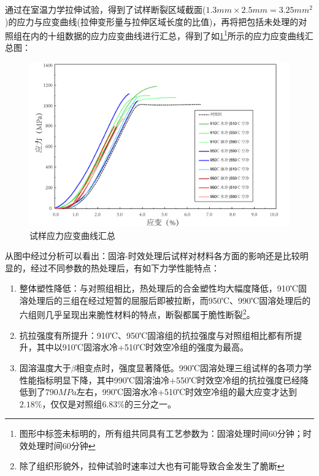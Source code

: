 通过在室温力学拉伸试验，得到了试样断裂区域截面($ 1.3mm\times2.5mm=3.25mm^2 $)的应力与应变曲线(拉伸变形量与拉伸区域长度的比值)，再将把包括未处理的对照组在内的十组数据的应力应变曲线进行汇总，得到了如\ref{fig:试样应力应变曲线汇总}\footnote{图形中标签未标明的，所有组共同具有工艺参数为：固溶处理时间60分钟；时效处理时间60分钟}所示的应力应变曲线汇总图：
\begin{figure}[h!]
	\centering
	\includegraphics[width=0.99\linewidth]{pic/试样应力应变曲线汇总min.png}
	\caption{试样应力应变曲线汇总}
	\label{fig:试样应力应变曲线汇总}
\end{figure}


从图中经过分析可以看出：固溶-时效处理后试样对材料各方面的影响还是比较明显的，经过不同参数的热处理后，有如下力学性能特点：
\begin{enumerate}
	\item {整体塑性降低：}与对照组相比，热处理后的合金塑性均大幅度降低，910℃固溶处理后的三组在经过短暂的屈服后即被拉断，而950℃、990℃固溶处理后的六组则几乎呈现出来脆性材料的特点，断裂都属于脆性断裂\footnote{除了组织形貌外，拉伸试验时速率过大也有可能导致合金发生了脆断}。
	\item {抗拉强度有所提升：}910℃、950℃固溶组的抗拉强度与对照组相比都有所提升，其中以910℃固溶水冷+510℃时效空冷组的强度为最高。
	\item {固溶温度大于$\beta$相变点时，强度显著降低。}990℃固溶处理三组试样的各项力学性能指标明显下降，其中990℃固溶油冷+550℃时效空冷组的抗拉强度已经降低到了$ 790MPa $左右，990℃固溶水冷+510℃时效空冷组的最大应变才达到$ 2.18\% $，仅仅是对照组$ 6.83\% $的三分之一。
\end{enumerate}
